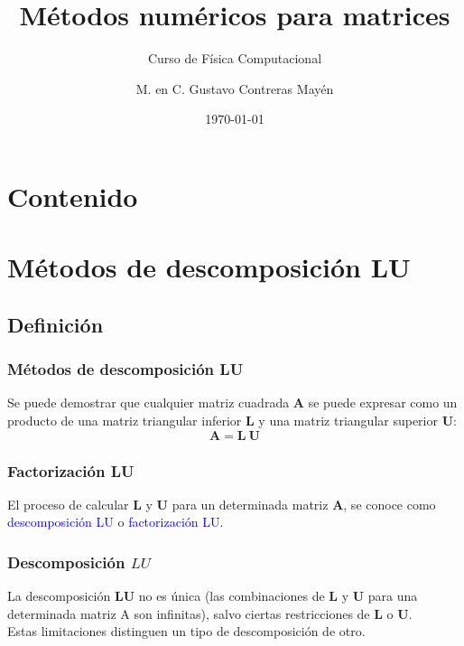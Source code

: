


	
\normalfont
\usepackage{ccfonts}%
\usepackage[T1]{fontenc}%
\renewcommand{\rmdefault}{cmr}%
\linespread{1.3}
\title{Métodos numéricos para matrices}
\subtitle{Curso de Física Computacional}
\author{M. en C. Gustavo Contreras Mayén}
\date{\today}

\maketitle
\fontsize{14}{14}\selectfont
{}
\section*{Contenido}
\section{Métodos de descomposición LU}
\subsection{Definición}
\begin{frame}
\frametitle{Métodos de descomposición \textbf{LU}}
Se puede demostrar que cualquier matriz cuadrada $\mathbf{A}$ se puede expresar como un producto de una matriz triangular inferior $\mathbf{L}$ y una matriz triangular superior $\mathbf{U}$:
\[ \mathbf{A = L \: U}\]
\end{frame}
\begin{frame}
\frametitle{Factorización \textbf{LU}}
El proceso de calcular \textbf{L} y \textbf{U} para un determinada matriz \textbf{A}, se conoce como \textcolor{blue}{descomposición LU} o \textcolor{blue}{factorización LU}.
\end{frame}
\begin{frame}
\frametitle{Descomposición $LU$}
La descomposición $\mathbf{LU}$ no es única (las combinaciones de $\mathbf{L}$ y $\mathbf{U}$ para una determinada matriz A son infinitas), salvo ciertas restricciones de $\mathbf{L}$ o $\mathbf{U}$. 
\\
\bigskip
Estas limitaciones distinguen un tipo de descomposición de otro.
\end{frame}
